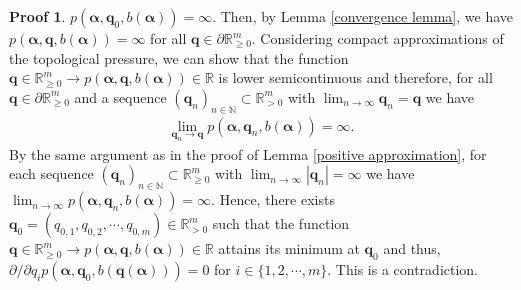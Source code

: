 \documentclass{article}
\theoremstyle{definition}
\newtheorem*{pf}{Proof}
\begin{document}
\begin{pf}
$p(\boldsymbol{\alpha},\boldsymbol{q}_0,b(\boldsymbol{\alpha}))=\infty$.
Then, by Lemma \ref{convergence lemma}, we have 
    $p(\boldsymbol{\alpha},\boldsymbol{q},b(\boldsymbol{\alpha}))=\infty$
for all $\boldsymbol{q}\in\partial \mathbb{R}_{\geq 0}^m$.
Considering compact approximations of the topological pressure, we can show that the function $\boldsymbol{q}\in\mathbb{R}_{\geq0}^m\rightarrow p(\boldsymbol{\alpha},\boldsymbol{q},b(\boldsymbol{\alpha}))\in\mathbb{R}$ is lower semicontinuous and therefore, for all $\boldsymbol{q}\in \partial \mathbb{R}_{\geq 0}^m$ and a sequence $(\boldsymbol{q}_n)_{n\in\mathbb{N}}\subset\mathbb{R}_{>0}^m$ with $\lim_{n\to\infty}\boldsymbol{q}_{n}=\boldsymbol{q}$ we have
\begin{align*}
\lim_{\boldsymbol{q}_n \to \boldsymbol{q} } p(\boldsymbol{\alpha},\boldsymbol{q}_n,b(\boldsymbol{\alpha}))=\infty.
\end{align*}
By the same argument as in the proof of Lemma \ref{positive approximation}, for each sequence $(\boldsymbol{q}_n)_{n\in\mathbb{N}}\subset\mathbb{R}^m_{\geq 0}$ with $\lim_{n\to\infty}|\boldsymbol{q}_n|=\infty$ we have 
    $\lim_{n \to \infty}p(\boldsymbol{\alpha},\boldsymbol{q}_n,b(\boldsymbol{\alpha}))=\infty.$
Hence, there exists $\boldsymbol{q}_0=(q_{0,1},q_{0,2},\cdots,q_{0,m}) \in \mathbb{R}^m_{>0}$ such that the function $\boldsymbol{q}\in\mathbb{R}_{\geq0}^m\rightarrow p(\boldsymbol{\alpha},\boldsymbol{q},b(\boldsymbol{\alpha}))\in\mathbb{R}$  attains its minimum at $\boldsymbol{q}_0$ and thus,
$\nonumber
     {\partial}/{\partial q_i}p(\boldsymbol{\alpha},\boldsymbol{q}_0,b(\boldsymbol{q}(\boldsymbol{\alpha})))=0$
for $i\in\lbrace1,2,\cdots,m\rbrace$. This is a contradiction.


\end{pf}
\end{document}
